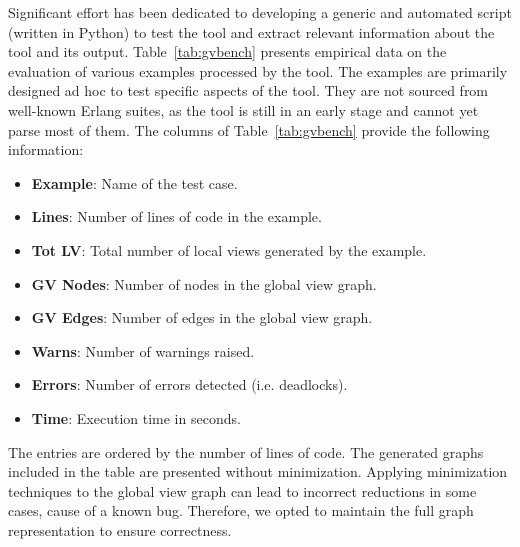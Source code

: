 Significant effort has been dedicated to developing a 
generic and automated script (written in Python) to test the tool and extract 
relevant information about the tool and its output.
Table~\ref{tab:gvbench} presents empirical data on the evaluation of various 
examples processed by the tool. 
The examples are primarily designed ad hoc to test specific aspects of the tool.
They are not sourced from well-known Erlang suites, as the tool is still in an
early stage and cannot yet parse most of them.
The columns of Table~\ref{tab:gvbench} provide the following information:

\begin{itemize}
    \item \textbf{Example}: Name of the test case.
    \item \textbf{Lines}: Number of lines of code in the example.
    \item \textbf{Tot LV}: Total number of local views generated by the example.
    \item \textbf{GV Nodes}: Number of nodes in the global view graph.
    \item \textbf{GV Edges}: Number of edges in the global view graph.
    \item \textbf{Warns}: Number of warnings raised.
    \item \textbf{Errors}: Number of errors detected (i.e. deadlocks).
    \item \textbf{Time}: Execution time in seconds.
\end{itemize}

The entries are ordered by the number of lines of code. The generated graphs 
included in the table are presented without minimization. Applying minimization 
techniques to the global view graph can lead to incorrect reductions in some 
cases, cause of a known bug. Therefore, we opted to maintain the full 
graph representation to ensure correctness.

